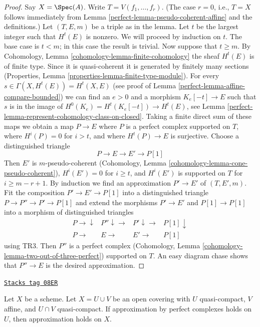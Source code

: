 \begin{proof}

Say $X = \Spec(A)$. Write $T = V(f_1, \ldots, f_r)$.
(The case $r = 0$, i.e., $T = X$ follows immediately from
Lemma \ref{perfect-lemma-pseudo-coherent-affine} and the definitions.)
Let $(T, E, m)$ be a triple as in the lemma.
Let $t$ be the largest integer such that $H^t(E)$ is nonzero.
We will proceed by induction on $t$. The base case is $t < m$; in
this case the result is trivial. Now suppose that $t \geq m$. By
Cohomology, Lemma \ref{cohomology-lemma-finite-cohomology}
the sheaf $H^t(E)$ is of finite type. Since it is quasi-coherent
it is generated by finitely many sections
(Properties, Lemma \ref{properties-lemma-finite-type-module}).
For every $s \in \Gamma(X, H^t(E)) = H^t(X, E)$
(see proof of Lemma \ref{perfect-lemma-affine-compare-bounded})
we can find an $e > 0$ and a morphism $K_e[-t] \to E$
such that $s$ is in the image of
$H^0(K_e) = H^t(K_e[-t]) \to H^t(E)$, see
Lemma \ref{perfect-lemma-represent-cohomology-class-on-closed}.
Taking a finite direct sum of these maps we obtain a map
$P \to E$ where $P$ is a perfect complex supported on $T$,
where $H^i(P) = 0$ for $i > t$, and where $H^t(P) \to E$ is
surjective. Choose a distinguished triangle
$$
P \to E \to E' \to P[1]
$$
Then $E'$ is $m$-pseudo-coherent
(Cohomology, Lemma \ref{cohomology-lemma-cone-pseudo-coherent}),
$H^i(E') = 0$ for $i \geq t$, and
$H^i(E')$ is supported on $T$ for $i \geq m - r + 1$.
By induction we find an approximation $P' \to E'$
of $(T, E', m)$. Fit the composition $P' \to E' \to P[1]$
into a distinguished triangle $P \to P'' \to P' \to P[1]$
and extend the morphisms $P' \to E'$ and $P[1] \to P[1]$ into
a morphism of distinguished triangles
$$
\begin{array}{cccc}P \longrightarrow\downarrow & P'' \downarrow\longrightarrow & P' \downarrow\longrightarrow & P[1] \downarrow \\ P \longrightarrow & E \longrightarrow & E' \longrightarrow & P[1]\end{array}
$$
using TR3. Then $P''$ is a perfect complex
(Cohomology, Lemma \ref{cohomology-lemma-two-out-of-three-perfect})
supported on $T$.
An easy diagram chase shows that $P'' \to E$ is the desired
approximation.
\end{proof}

\begin{lemma}
\label{perfect-lemma-induction-step}
\href{https://stacks.math.columbia.edu/tag/08ER}{\texttt{Stacks tag 08ER}}

Let $X$ be a scheme. Let $X = U \cup V$ be an open covering
with $U$ quasi-compact, $V$ affine, and $U \cap V$ quasi-compact.
If approximation by perfect complexes holds on $U$,
then approximation holds on $X$.
\end{lemma}

